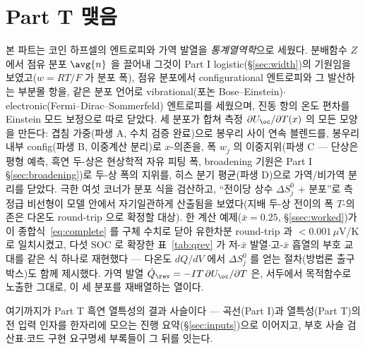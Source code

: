 \section*{Part T 맺음}

본 파트는 코인 하프셀의 엔트로피와 가역 발열을 \emph{통계열역학}으로 세웠다. 분배함수 $Z$ 에서 점유 분포
$\avg{n}$ 을 끌어내 그것이 Part I logistic(\S\ref{sec:width})의 기원임을 보였고($w=RT/F$ 가 분포 폭), 점유 분포에서
configurational 엔트로피와 그 발산하는 부분몰 항을, 같은 분포 언어로 vibrational(포논 Bose--Einstein)$\cdot$
electronic(Fermi--Dirac--Sommerfeld) 엔트로피를 세웠으며, 진동 항의 온도 편차를 Einstein 모드 보정으로 따로
닫았다. 세 분포가 합쳐 측정 $\partial U_\oc/\partial T(x)$ 의 모든 모양을 만든다: 겹침 가중(파생 A, 수치 검증
완료)으로 봉우리 사이 연속 블렌드를, 봉우리 내부 config(파생 B, 이중계산 분리)로 $x$-의존을, 폭 $w_j$ 의
이중지위(파생 C --- 단상은 평형 예측, 흑연 두-상은 현상학적 자유 피팅 폭, broadening 기원은 Part I
\S\ref{sec:broadening})로
두-상 폭의 지위를, 히스 분기 평균(파생 D)으로 가역/비가역 분리를 닫았다. 극한 여섯 코너가 분포 식을 검산하고,
``전이당 상수 $\Delta S^0_j$ $+$ 분포''로 측정급 비선형이 모델 안에서 자기일관하게 산출됨을 보였다(지배 두-상
전이의 폭 $T$-의존은 다온도 round-trip 으로 확정할 대상). 한 계산 예제($\bar x{=}0.25$, \S\ref{ssec:worked})가
이 종합식~\eqref{eq:complete} 를 구체 수치로 닫아 유한차분 round-trip 과 $<0.001\,\mu$V/K 로 일치시켰고, 다섯
SOC 로 확장한 표~\ref{tab:qrev} 가 저-$\bar x$ 발열$\cdot$고-$\bar x$ 흡열의 부호 교대를 같은 식 하나로
재현했다 --- 다온도 $dQ/dV$ 에서 $\Delta S^0_j$ 를 얻는 절차(방법론 출구 박스)도 함께 제시했다. 가역 발열
$\dot Q_\rev=-IT\,\partial U_\oc/\partial T$ 은, 서두에서 목적함수로 노출한 그대로, 이 세 분포를 재배열하는
열이다.

여기까지가 Part T 흑연 열특성의 결과 사슬이다 --- 곡선(Part I)과 열특성(Part T)의 전 입력 인자를 한자리에
모으는 진행 요약(\S\ref{sec:inputs})으로 이어지고, 부호 사슬 검산표$\cdot$코드 구현 요구명세 부록들이
그 뒤를 잇는다.

